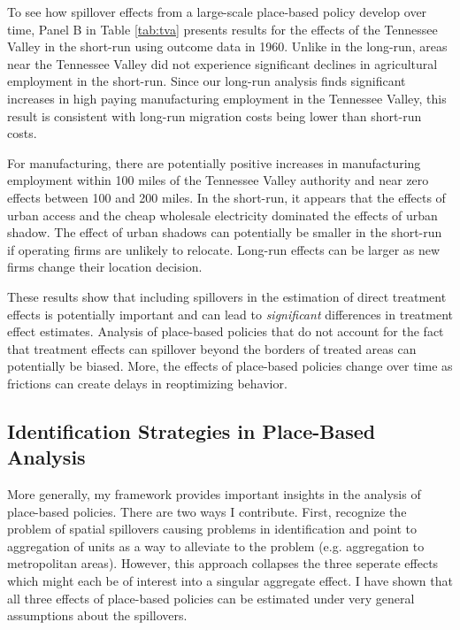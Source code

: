 \documentclass[11pt]{article}
\begin{document}
To see how spillover effects from a large-scale place-based policy develop over time, Panel B in Table \ref{tab:tva} presents results for the effects of the Tennessee Valley in the short-run using outcome data in 1960. Unlike in the long-run, areas near the Tennessee Valley did not experience significant declines in agricultural employment in the short-run. Since our long-run analysis finds significant increases in high paying manufacturing employment in the Tennessee Valley, this result is consistent with long-run migration costs being lower than short-run costs.

For manufacturing, there are potentially positive increases in manufacturing employment within 100 miles of the Tennessee Valley authority and near zero effects between 100 and 200 miles. In the short-run, it appears that the effects of urban access and the cheap wholesale electricity dominated the effects of urban shadow. The effect of urban shadows can potentially be smaller in the short-run if operating firms are unlikely to relocate. Long-run effects can be larger as new firms change their location decision.

These results show that including spillovers in the estimation of direct treatment effects is potentially important and can lead to \emph{significant} differences in treatment effect estimates. Analysis of place-based policies that do not account for the fact that treatment effects can spillover beyond the borders of treated areas can potentially be biased. More, the effects of place-based policies change over time as frictions can create delays in reoptimizing behavior. 

\subsection{Identification Strategies in Place-Based Analysis}

More generally, my framework provides important insights in the analysis of place-based policies. There are two ways I contribute. First, \citet{Baum-Snow_Ferreira_2015} recognize the problem of spatial spillovers causing problems in identification and point to aggregation of units as a way to alleviate to the problem (e.g. aggregation to metropolitan areas). However, this approach collapses the three seperate effects which might each be of interest into a singular aggregate effect. I have shown that all three effects of place-based policies can be estimated under very general assumptions about the spillovers.
\end{document}
